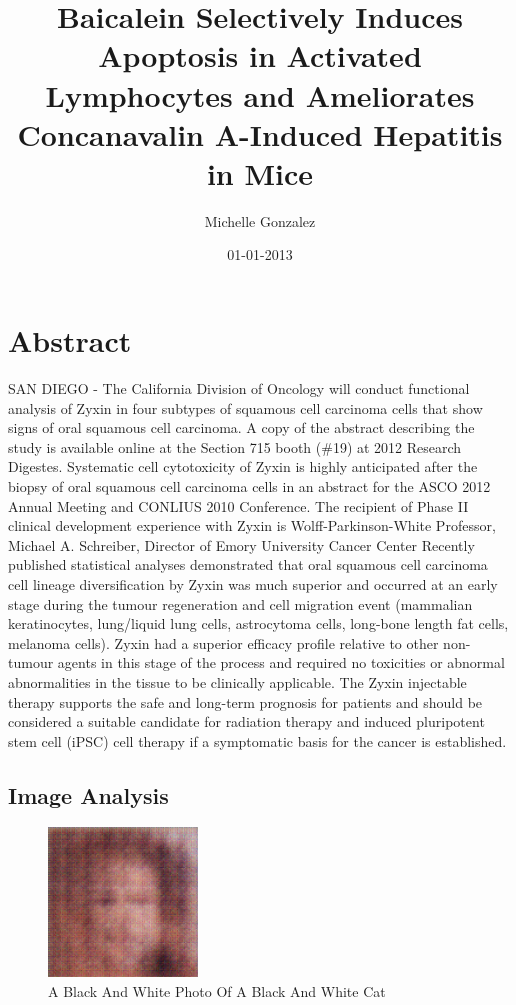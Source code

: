 \documentclass{article}%
\title{Baicalein Selectively Induces Apoptosis in Activated Lymphocytes and Ameliorates Concanavalin A{-}Induced Hepatitis in Mice}%
\author{Michelle Gonzalez}%
\affil{Nephrology Unit, Department of Medicine, Faculty of Medicine, Thammasat University (Rangsit Campus), Khlong Nueng, Khlong Luang, Pathum Thani 12121, Thailand}%
\date{01{-}01{-}2013}%
\begin{document}
%
\normalsize%
\maketitle%
\section{Abstract}%
\label{sec:Abstract}%
SAN DIEGO {-} The California Division of Oncology will conduct functional analysis of Zyxin in four subtypes of squamous cell carcinoma cells that show signs of oral squamous cell carcinoma.\newline%
A copy of the abstract describing the study is available online at the Section 715 booth (\#19) at 2012 Research Digestes.\newline%
Systematic cell cytotoxicity of Zyxin is highly anticipated after the biopsy of oral squamous cell carcinoma cells in an abstract for the ASCO 2012 Annual Meeting and CONLIUS 2010 Conference. The recipient of Phase II clinical development experience with Zyxin is Wolff{-}Parkinson{-}White Professor, Michael A. Schreiber, Director of Emory University Cancer Center\newline%
Recently published statistical analyses demonstrated that oral squamous cell carcinoma cell lineage diversification by Zyxin was much superior and occurred at an early stage during the tumour regeneration and cell migration event (mammalian keratinocytes, lung/liquid lung cells, astrocytoma cells, long{-}bone length fat cells, melanoma cells). Zyxin had a superior efficacy profile relative to other non{-}tumour agents in this stage of the process and required no toxicities or abnormal abnormalities in the tissue to be clinically applicable.\newline%
The Zyxin injectable therapy supports the safe and long{-}term prognosis for patients and should be considered a suitable candidate for radiation therapy and induced pluripotent stem cell (iPSC) cell therapy if a symptomatic basis for the cancer is established.

%
\subsection{Image Analysis}%
\label{subsec:ImageAnalysis}%


\begin{figure}[h!]%
\centering%
\includegraphics[width=150px]{500_fake_images/samples_5_471.png}%
\caption{A Black And White Photo Of A Black And White Cat}%
\end{figure}

%
\end{document}
